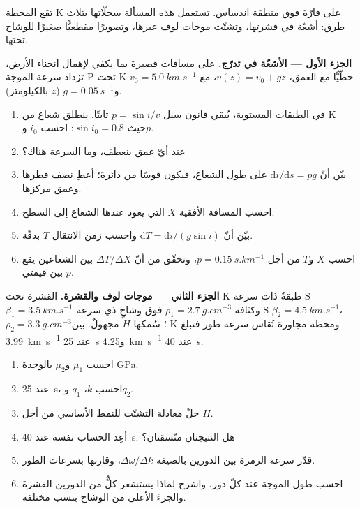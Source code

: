 \begin{problem}
\label{pb:b3:seismology-imaging:1}
تقع المحطة K على قارّة فوق منطقة اندساس. تستعمل هذه المسألة
سجلّاتها بثلاث طرق: أشعّة في قشرتها، وتشتّت موجات لوف عبرها،
وتصويرًا مقطعيًّا صغيرًا للوشاح تحتها.

\medskip
\noindent\textbf{الجزء الأول --- الأشعّة في تدرّج.} على مسافات قصيرة بما يكفي لإهمال
انحناء الأرض، تزداد سرعة الموجة P تحت K خطّيًّا مع العمق،
$v(z) = v_0 + gz$، مع $v_0 = \qty{5.0}{km.s^{-1}}$
و$g = \qty{0.05}{s^{-1}}$ ($z$ بالكيلومتر).
\begin{enumerate}
  \item في الطبقات المستوية، يُبقي قانون سنل $p = \sin i/v$ ثابتًا. ينطلق شعاع
        من K حيث $\sin i_0 = 0.8$: احسب $i_0$ و$p$.
  \item عند أيّ عمق ينعطف، وما السرعة هناك؟
  \item بيّن أنّ $\mathrm di/\mathrm ds = pg$ على طول الشعاع، فيكون قوسًا
        من دائرة؛ أعطِ نصف قطرها وعمق مركزها.
  \item احسب المسافة الأفقية $X$ التي يعود عندها الشعاع إلى
        السطح.
  \item بيّن أنّ $\mathrm dT = \mathrm di/(g\sin i)$ واحسب زمن
        الانتقال $T$ بدقّة.
  \item احسب $X$ و$T$ من أجل $p = \qty{0.15}{s.km^{-1}}$، وتحقّق من أنّ
        $\Delta T/\Delta X$ بين الشعاعين يقع بين قيمتي
        $p$.
\end{enumerate}

\noindent\textbf{الجزء الثاني --- موجات لوف والقشرة.} القشرة تحت K طبقةٌ
ذات سرعة S $\beta_1 = \qty{3.5}{km.s^{-1}}$ وكثافة
$\rho_1 = \qty{2.7}{g.cm^{-3}}$ فوق وشاحٍ ذي سرعة S $\beta_2 =
\qty{4.5}{km.s^{-1}}$، $\rho_2 = \qty{3.3}{g.cm^{-3}}$؛ سُمكها $H$
مجهولٌ. بين K ومحطة مجاورة تُقاس سرعة طور 
فتبلغ \qty{3.99}{km.s^{-1}} عند \qty{25}{s} و\qty{4.25}{km.s^{-1}} عند
\qty{40}{s}.
\begin{enumerate}[resume]
  \item احسب $\mu_1$ و$\mu_2$ بالوحدة \unit{GPa}.
  \item عند \qty{25}{s}، احسب $k$، $q_1$ و$q_2$.
  \item حلّ معادلة التشتّت للنمط الأساسي من أجل $H$.
  \item أعِد الحساب نفسه عند \qty{40}{s}. هل النتيجتان متّسقتان؟
  \item قدّر سرعة الزمرة بين الدورين بالصيغة
        $\Delta\omega/\Delta k$، وقارنها بسرعات الطور.
  \item احسب طول الموجة عند كلّ دور، واشرح لماذا يستشعر كلٌّ
        من الدورين القشرةَ والجزءَ الأعلى من الوشاح بنسب
        مختلفة.
\end{enumerate}


\end{problem}
